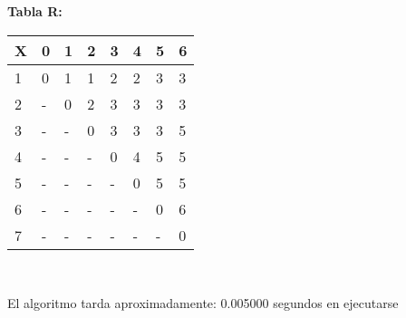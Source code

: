 \documentclass[10pt,letterpaper]{article}
\begin{document}
\textbf{Tabla R: }
\begin{center}
\begin{tabu} to 1.0\textwidth { | l | l | l | l | l | l | l | l | }
\hline
{}\color{black}\textbf{X} & \color{black}\textbf{0} & \color{black}\textbf{1} & \color{black}\textbf{2} & \color{black}\textbf{3} & \color{black}\textbf{4} & \color{black}\textbf{5} & \color{black}\textbf{6} \\ 
\hline
{}\color{black}1 &  0  &  1  &  1  &  2  &  2  &  3  &  3  \\ 
\hline
{}\color{black}2 &  -  &  0  &  2  &  3  &  3  &  3  &  3  \\ 
\hline
{}\color{black}3 &  -  &  -  &  0  &  3  &  3  &  3  &  5  \\ 
\hline
{}\color{black}4 &  -  &  -  &  -  &  0  &  4  &  5  &  5  \\ 
\hline
{}\color{black}5 &  -  &  -  &  -  &  -  &  0  &  5  &  5  \\ 
\hline
{}\color{black}6 &  -  &  -  &  -  &  -  &  -  &  0  &  6  \\ 
\hline
{}\color{black}7 &  -  &  -  &  -  &  -  &  -  &  -  &  0  \\ 
\hline
\end{tabu} \\
\end{center}
El algoritmo tarda aproximadamente: 0.005000 segundos en ejecutarse
\end{document}
